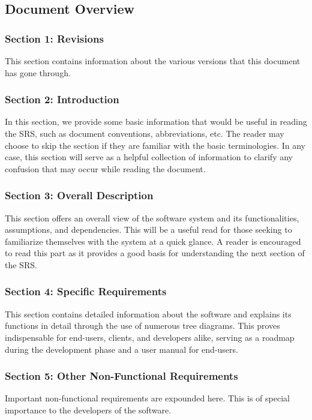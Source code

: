 \documentclass{scrreprt}
\begin{document}
\subsection*{Document Overview}
\subsubsection*{Section 1: Revisions}
This section contains information about the various versions that this document has gone through.

\subsubsection*{Section 2: Introduction}
In this section, we provide some basic information that would be useful in reading the SRS, such as document conventions, abbreviations, etc. The reader may choose to skip the section if they are familiar with the basic terminologies. In any case, this section will serve as a helpful collection of information to clarify any confusion that may occur while reading the document.

\subsubsection*{Section 3: Overall Description}
This section offers an overall view of the software system and its functionalities, assumptions, and dependencies. This will be a useful read for those seeking to familiarize themselves with the system at a quick glance. A reader is encouraged to read this part as it provides a good basis for understanding the next section of the SRS.

\subsubsection*{Section 4: Specific Requirements}
This section contains detailed information about the software and explains its functions in detail through the use of numerous tree diagrams. This proves indispensable for end-users, clients, and developers alike, serving as a roadmap during the development phase and a user manual for end-users.

\subsubsection*{Section 5: Other Non-Functional Requirements}
Important non-functional requirements are expounded here. This is of special importance to the developers of the software.
\end{document}

